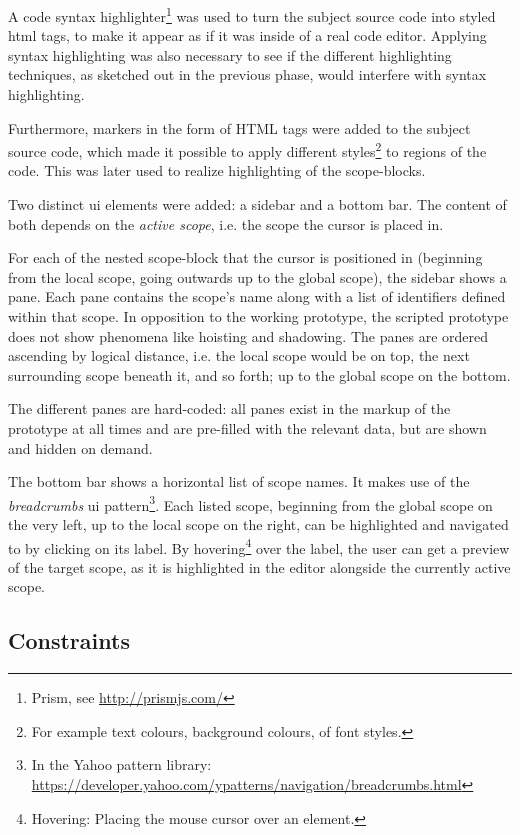 A code syntax highlighter\footnote{Prism, see \url{http://prismjs.com/}}
was used to turn the subject source code into styled \ac{html} tags, to
make it appear as if it was inside of a real code editor. Applying
syntax highlighting was also necessary to see if the different
highlighting techniques, as sketched out in the previous phase, would
interfere with syntax highlighting.

Furthermore, markers in the form of HTML tags were added to the subject
source code, which made it possible to apply different
styles\footnote{For example text colours, background colours, of font styles.}
to regions of the code. This was later used to realize highlighting of
the \glspl{scope-block}.

Two distinct \ac{ui} elements were added: a sidebar and a bottom bar.
The content of both depends on the \emph{active scope}, i.e. the scope
the cursor is placed in.

For each of the nested \ac{scope-block} that the cursor is positioned in
(beginning from the local scope, going outwards up to the global scope),
the sidebar shows a pane. Each pane contains the scope’s name along with
a list of identifiers defined within that scope. In opposition to the
working prototype, the scripted prototype does not show phenomena like
hoisting and shadowing. The panes are ordered ascending by logical
distance, i.e. the local scope would be on top, the next surrounding
scope beneath it, and so forth; up to the global scope on the bottom.

The different panes are hard-coded: all panes exist in the markup of the
prototype at all times and are pre-filled with the relevant data, but
are shown and hidden on demand.

The bottom bar shows a horizontal list of scope names. It makes use of
the \emph{breadcrumbs} \ac{ui}
pattern\footnote{In the Yahoo pattern library: \url{https://developer.yahoo.com/ypatterns/navigation/breadcrumbs.html}}.
Each listed scope, beginning from the global scope on the very left, up
to the local scope on the right, can be highlighted and navigated to by
clicking on its label. By
hovering\footnote{Hovering: Placing the mouse cursor over an element.}
over the label, the user can get a preview of the target scope, as it is
highlighted in the editor alongside the currently active scope.

\subsection{Constraints}\label{constraints}

